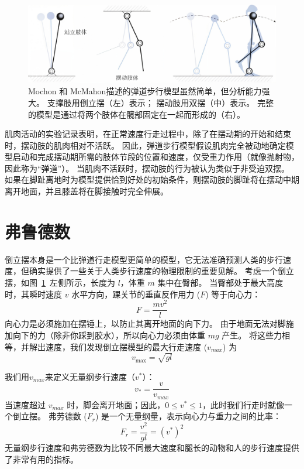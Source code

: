 \begin{figure}[!htb]
	\centering
	\includegraphics[width=0.8\linewidth]{chap2/2_9}
	\caption{Mochon 和 McMahon\cite{mochon1980ballistic}描述的弹道步行模型虽然简单，但分析能力强大。
		支撑肢用倒立摆（左）表示；
		摆动肢用双摆（中）表示。
		完整的模型是通过将两个肢体在髋部固定在一起而形成的（右）。 \label{fig:2_9}}
\end{figure}


肌肉活动的实验记录表明，在正常速度行走过程中，除了在摆动期的开始和结束时，摆动肢的肌肉相对不活跃。
因此，弹道步行模型假设肌肉完全被动地确定模型启动和完成摆动期所需的肢体节段的位置和速度，仅受重力作用（就像抛射物，因此称为“弹道”）。
当肌肉不活跃时，摆动肢的行为被认为类似于非受迫双摆。
如果在脚趾离地时为模型提供恰到好处的初始条件，则摆动肢的脚趾将在摆动中期离开地面，并且膝盖将在脚接触时完全伸展。


\section{弗鲁德数}

倒立摆本身是一个比弹道行走模型更简单的模型，它无法准确预测人类的步行速度，但确实提供了一些关于人类步行速度的物理限制的重要见解。
考虑一个倒立摆，如图~\ref{fig:2_9}~左侧所示，长度为 $l$，体重 $m$ 集中在臀部。
当臀部处于最大高度时，其瞬时速度 $v$ 水平方向，踝关节的垂直反作用力 ($F$) 等于向心力：
%
\begin{equation}
	F = \frac{m v^2}{l}
\end{equation}
% 
向心力是必须施加在摆锤上，以防止其离开地面的向下力。
由于地面无法对脚施加向下的力（除非你踩到胶水），所以向心力必须由体重 $mg$ 产生。
将这些力相等，并解出速度，我们发现倒立摆模型的最大行走速度 ($v_{max}$) 为
%
\begin{equation}
	v_{\text{max}} = \sqrt{g l}
\end{equation}

我们用$v_{max}$来定义无量纲步行速度（$v^{*}$）：
\begin{equation}
	v_{*} = \frac{v}{v_{max}}
\end{equation}
%
当速度超过 $v_{max}$ 时，脚会离开地面；因此，$0 \leq v^{*} \leq 1$，此时我们行走时就像一个倒立摆。
弗劳德数 ($F_r$) 是一个无量纲量，表示向心力与重力之间的比率：
%
\begin{equation}
	F_r = \frac{v^2}{g l}
		= (v^{*})^2
\end{equation}
%
无量纲步行速度和弗劳德数为比较不同最大速度和腿长的动物和人的步行速度提供了非常有用的指标。


